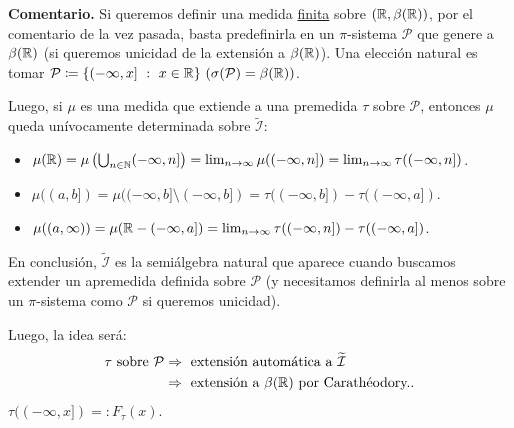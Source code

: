 
\textbf{Comentario.} Si queremos definir una medida \underline{finita} sobre $(\mathbb{R},\beta(\mathbb{R}))$, por el comentario de la vez pasada, basta predefinirla en un $\pi$-sistema $\mathcal{P}$ que genere a $\beta(\mathbb{R})$ (si queremos unicidad de la extensión a $\beta(\mathbb{R})$). Una elección natural es tomar $\mathcal{P} \coloneq \{ (-\infty,x] \ : \ x \in \mathbb{R} \} \ (\sigma(\mathcal{P}) = \beta(\mathbb{R}))$. \par
\smallskip
Luego, si $\mu$ es una medida que extiende a una premedida $\tau$ sobre $\mathcal{P}$, entonces $\mu$ queda unívocamente determinada sobre $\widetilde{\mathcal{I}}$:
\begin{itemize}
	\item $\mu(\mathbb{R}) = \mu\left( \bigcup_{n\in\mathbb{N}} (-\infty,n] \right) = \lim_{n \to \infty} \mu((-\infty,n]) = \lim_{n \to \infty} \tau((-\infty,n])$.

	\item $\mu((a,b]) = \mu((-\infty,b] \setminus (-\infty,b]) = \tau((-\infty,b]) - \tau((-\infty,a])$.

	\item $\mu((a,\infty)) = \mu(\mathbb{R}-(-\infty,a]) = \lim_{n \to \infty} \tau((-\infty,n]) - \tau((-\infty,a])$.
\end{itemize}
En conclusión, $\widetilde{\mathcal{I}}$ es la semiálgebra natural que aparece cuando buscamos extender un apremedida definida sobre $\mathcal{P}$ (y necesitamos definirla al menos sobre un $\pi$-sistema como $\mathcal{P}$ si queremos unicidad). \par
\medskip
Luego, la idea será:
\begin{align*}
	\tau \text{ sobre } \mathcal{P} &\Rightarrow \text{ extensión automática a } \widetilde{\mathcal{I}} \\
	&\Rightarrow \text{ extensión a } \beta(\mathbb{R}) \text{ por Carathéodory.}
.\end{align*}
$\tau((-\infty,x]) =: F_{\tau}(x)$.

